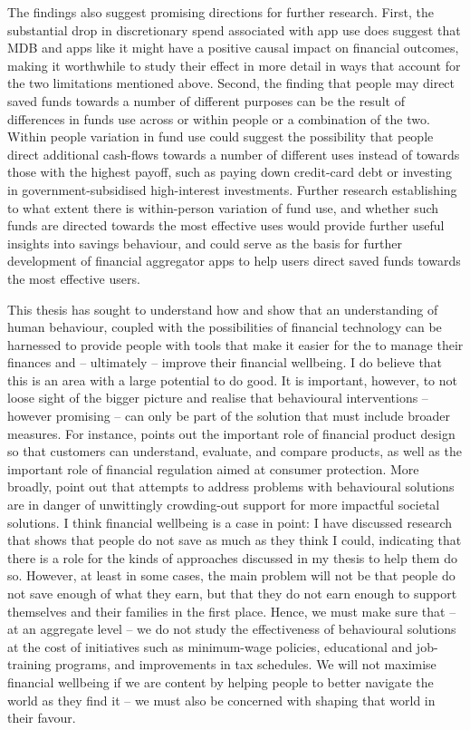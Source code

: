 The findings also suggest promising directions for further research. First, the
substantial drop in discretionary spend associated with app use does suggest
that MDB and apps like it might have a positive causal impact on financial
outcomes, making it worthwhile to study their effect in more detail in ways
that account for the two limitations mentioned above. Second, the finding that
people may direct saved funds towards a number of different purposes can be the
result of differences in funds use across or within people or a combination of
the two. Within people variation in fund use could suggest the possibility that
people direct additional cash-flows towards a number of different uses instead
of towards those with the highest payoff, such as paying down credit-card debt
or investing in government-subsidised high-interest investments. Further
research establishing to what extent there is within-person variation of fund
use, and whether such funds are directed towards the most effective uses would
provide further useful insights into savings behaviour, and could serve as the
basis for further development of financial aggregator apps to help users direct
saved funds towards the most effective users.

This thesis has sought to understand how and show that an understanding of
human behaviour, coupled with the possibilities of financial technology can be
harnessed to provide people with tools that make it easier for the to manage
their finances and -- ultimately -- improve their financial wellbeing. I do
believe that this is an area with a large potential to do good. It is
important, however, to not loose sight of the bigger picture and realise that
behavioural interventions -- however promising -- can only be part of the
solution that must include broader measures. For instance,
\citet{agarwal2017shape} points out the important role of financial product
design so that customers can understand, evaluate, and compare products, as
well as the important role of financial regulation aimed at consumer
protection. More broadly, \citet{chater2022frame} point out that attempts to
address problems with behavioural solutions are in danger of unwittingly
crowding-out support for more impactful societal solutions. I think financial
wellbeing is a case in point: I have discussed research that shows that people
do not save as much as they think I could, indicating that there is a role for
the kinds of approaches discussed in my thesis to help them do so. However, at
least in some cases, the main problem will not be that people do not save
enough of what they earn, but that they do not earn enough to support
themselves and their families in the first place. Hence, we must make sure that
-- at an aggregate level -- we do not study the effectiveness of behavioural
solutions at the cost of initiatives such as minimum-wage policies, educational
and job-training programs, and improvements in tax schedules. We will not
maximise financial wellbeing if we are content by helping people to better
navigate the world as they find it -- we must also be concerned with shaping
that world in their favour.


